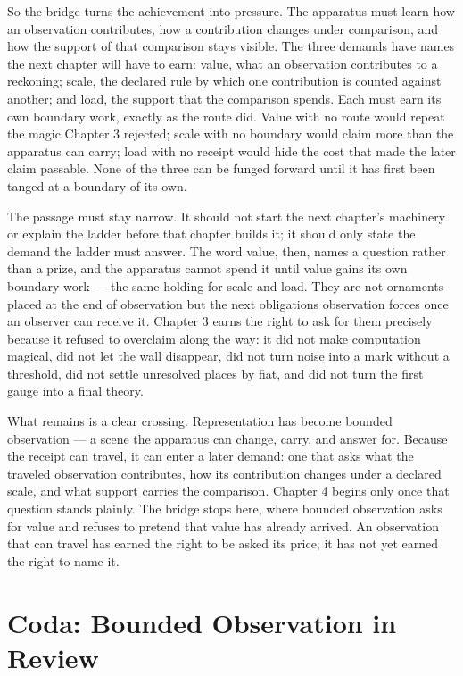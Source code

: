 So the bridge turns the achievement into pressure. The apparatus must learn how an observation contributes, how a contribution changes under comparison, and how the support of that comparison stays visible. The three demands have names the next chapter will have to earn: value, what an observation contributes to a reckoning; scale, the declared rule by which one contribution is counted against another; and load, the support that the comparison spends. Each must earn its own boundary work, exactly as the route did. Value with no route would repeat the magic Chapter 3 rejected; scale with no boundary would claim more than the apparatus can carry; load with no receipt would hide the cost that made the later claim passable. None of the three can be funged forward until it has first been tanged at a boundary of its own.

The passage must stay narrow. It should not start the next chapter's machinery or explain the ladder before that chapter builds it; it should only state the demand the ladder must answer. The word value, then, names a question rather than a prize, and the apparatus cannot spend it until value gains its own boundary work --- the same holding for scale and load. They are not ornaments placed at the end of observation but the next obligations observation forces once an observer can receive it. Chapter 3 earns the right to ask for them precisely because it refused to overclaim along the way: it did not make computation magical, did not let the wall disappear, did not turn noise into a mark without a threshold, did not settle unresolved places by fiat, and did not turn the first gauge into a final theory.

What remains is a clear crossing. Representation has become bounded observation --- a scene the apparatus can change, carry, and answer for. Because the receipt can travel, it can enter a later demand: one that asks what the traveled observation contributes, how its contribution changes under a declared scale, and what support carries the comparison. Chapter 4 begins only once that question stands plainly. The bridge stops here, where bounded observation asks for value and refuses to pretend that value has already arrived. An observation that can travel has earned the right to be asked its price; it has not yet earned the right to name it.

\section*{Coda: Bounded Observation in Review}

